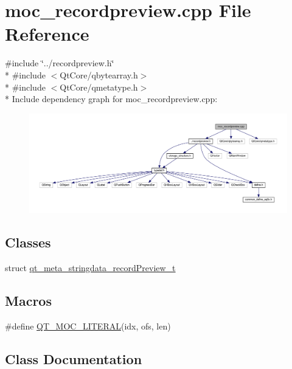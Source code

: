 \hypertarget{a00017}{\section{moc\+\_\+recordpreview.\+cpp File Reference}
\label{a00017}
}
{\ttfamily \#include \char`\"{}../recordpreview.\+h\char`\"{}}\\*
{\ttfamily \#include $<$Qt\+Core/qbytearray.\+h$>$}\\*
{\ttfamily \#include $<$Qt\+Core/qmetatype.\+h$>$}\\*
Include dependency graph for moc\+\_\+recordpreview.\+cpp\+:
\nopagebreak
\begin{figure}[H]
\begin{center}
\leavevmode
\includegraphics[width=350pt]{da/d15/a00188}
\end{center}
\end{figure}
\subsection*{Classes}
\begin{DoxyCompactItemize}
\item 
struct \hyperlink{a00017_df/d6a/a00119}{qt\+\_\+meta\+\_\+stringdata\+\_\+record\+Preview\+\_\+t}
\end{DoxyCompactItemize}
\subsection*{Macros}
\begin{DoxyCompactItemize}
\item 
\#define \hyperlink{a00017_a75bb9482d242cde0a06c9dbdc6b83abe}{Q\+T\+\_\+\+M\+O\+C\+\_\+\+L\+I\+T\+E\+R\+A\+L}(idx, ofs, len)
\end{DoxyCompactItemize}


\subsection{Class Documentation}
\label{df/d6a/a00119}
\hypertarget{a00017_df/d6a/a00119}{}
